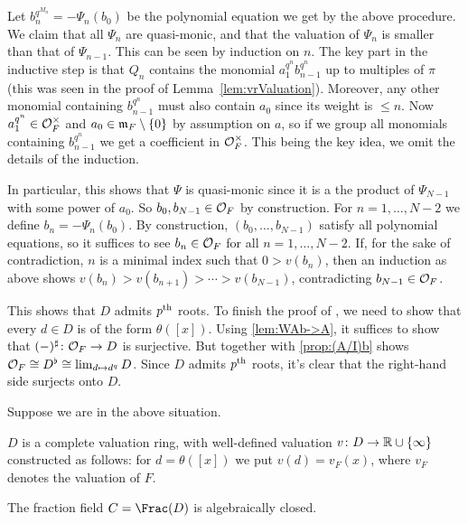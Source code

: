 \begin{proof*}
	Let $b_n^{q^{M_n}}=-\Psi_n(b_0)$ be the polynomial equation we get by the above procedure.	We claim that all $\Psi_n$ are quasi-monic, and that the valuation of $\Psi_n$ is smaller than that of $\Psi_{n-1}$. This can be seen by induction on $n$. The key part in the inductive step is that $Q_n$ contains the monomial $a_1^{q^n}b_{n-1}^{q^n}$ up to multiples of $\pi$ (this was seen in the proof of Lemma~\cref{lem:vrValuation}). Moreover, any other monomial containing $b_{n-1}^{q^n}$ must also contain $a_0$ since its weight is $\leq n$. Now $a_1^{q^n}\in\mathcal{O}_F^\times$ and $a_0\in\mathfrak{m}_F\setminus\{0\}$ by assumption on $a$, so if we group all monomials containing $b_{n-1}^{q^n}$ we get a coefficient in $\mathcal{O}_F^\times$. This being the key idea, we omit the details of the induction.
	
	In particular, this shows that $\Psi$ is quasi-monic since it is a the product of $\Psi_{N-1}$ with some power of $a_0$. So $b_0,b_{N-1}\in \mathcal{O}_F$ by construction. For $n=1,\dotsc,N-2$ we define $b_n=-\Psi_n(b_0)$. By construction, $(b_0,\dotsc,b_{N-1})$ satisfy all polynomial equations, so it suffices to see $b_n\in\mathcal{O}_F$ for all $n=1,\dotsc,N-2$. If, for the sake of contradiction, $n$ is a minimal index such that $0>v(b_n)$, then an induction as above shows $v(b_n)>v(b_{n+1})>\dotsb>v(b_{N-1})$, contradicting $b_{N-1}\in\mathcal{O}_F$.
	
	This shows that $D$ admits $p^{\text{th}}$ roots. To finish the proof of , we need to show that every $d\in D$ is of the form $\theta([x])$. Using \cref{lem:WAb->A}, it suffices to show that $(-)^\sharp\colon \Oo_F\morphism D$ is surjective. But  together with \cref{prop:(A/I)b} shows $\mathcal{O}_F\cong D^\flat\cong \operatorname*{lim}_{d\mapsto d^q}D$. Since $D$ admits $p^{\text{th}}$ roots, it's clear that the right-hand side surjects onto $D$.
\end{proof*}
\begin{cor}\label{cor:D}
	Suppose we are in the above situation.
	\begin{numerate}
		\item $D$ is a complete valuation ring, with well-defined valuation $v\colon D\morphism\IR\cup\{\infty\}$ constructed as follows: for $d=\theta([x])$ we put $v(d)=v_F(x)$, where $v_F$ denotes the valuation of $F$.
		\item The fraction field $C=\Frac(D)$ is algebraically closed.
	\end{numerate}
\end{cor}
